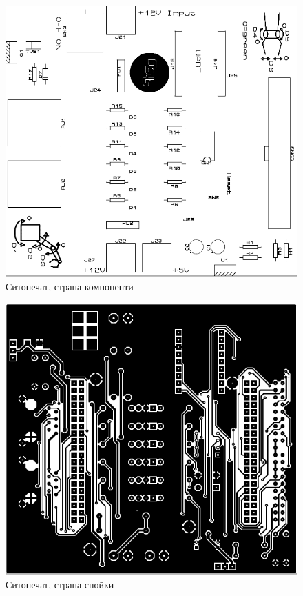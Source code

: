\begin{figure}[!htbp]
    \centering
    \includegraphics[page=1]{documents/top_silk.pdf}
    \caption{Ситопечат, страна компоненти}
    \label{fig:main_top_silk}
\end{figure}
\begin{figure}[!htbp]
    \centering
    \includegraphics[page=4]{documents/main_board.pdf}
    \caption{Ситопечат, страна спойки}
    \label{fig:main_bot_silk}
\end{figure}
